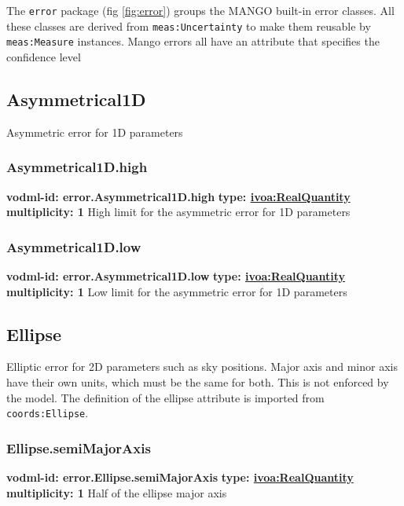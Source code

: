   The \texttt{error} package (fig \ref{fig:error}) groups the MANGO built-in error classes. All these classes are derived from \texttt{meas:Uncertainty} to make them reusable by \texttt{meas:Measure} instances. Mango errors all have an attribute that specifies the confidence level

  \subsection{Asymmetrical1D}
  \label{sect:error.Asymmetrical1D}
    Asymmetric error for 1D parameters

    \subsubsection{Asymmetrical1D.high}
      \textbf{vodml-id: error.Asymmetrical1D.high} \newline
      \textbf{type: \hyperref[sect:ivoa]{ivoa:RealQuantity}} \newline
      \textbf{multiplicity: 1} \newline
      High limit for the asymmetric error for 1D parameters

    \subsubsection{Asymmetrical1D.low}
      \textbf{vodml-id: error.Asymmetrical1D.low} \newline
      \textbf{type: \hyperref[sect:ivoa]{ivoa:RealQuantity}} \newline
      \textbf{multiplicity: 1} \newline
      Low limit for the asymmetric error for 1D parameters

  \subsection{Ellipse}
  \label{sect:error.Ellipse}
    Elliptic error for 2D parameters such as sky positions. Major axis and minor axis have their own units, which must be the same for both. This is not enforced by the model. The definition of the ellipse attribute is imported from \texttt{coords:Ellipse}.

    \subsubsection{Ellipse.semiMajorAxis}
      \textbf{vodml-id: error.Ellipse.semiMajorAxis} \newline
      \textbf{type: \hyperref[sect:ivoa]{ivoa:RealQuantity}} \newline
      \textbf{multiplicity: 1} \newline
      Half of the ellipse major axis


